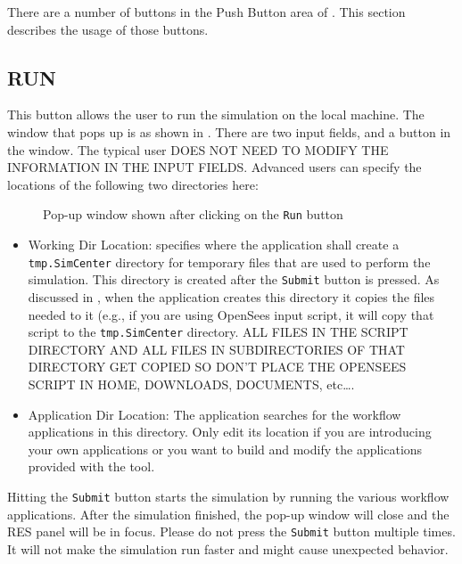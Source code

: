 There are a number of buttons in the Push Button area of . This section describes the usage of those buttons.

\subsection{RUN}

This button allows the user to run the simulation on the local machine. The window that pops up is as shown in . There
are two input fields, and a button in the window. The typical user DOES NOT NEED TO MODIFY THE INFORMATION IN THE INPUT FIELDS. Advanced users can specify the locations of the following two directories here:

\begin{figure}[!htbp]
  \caption{Pop-up window shown after clicking on the \texttt{Run} button}
  \label{fig:run_button_popup}
\end{figure}

\begin{itemize}
\item Working Dir Location: specifies where the \texttt{\getsoftwarename{}} application shall
create a \texttt{tmp.SimCenter} directory for temporary files that are used to perform the simulation. This directory is created after the \texttt{Submit} button is pressed. As discussed in , when
the application creates this directory it copies the files needed to it (e.g., if you are using OpenSees input script, it
will copy that script to the \texttt{tmp.SimCenter} directory. ALL FILES IN
THE SCRIPT DIRECTORY AND ALL FILES IN SUBDIRECTORIES OF THAT DIRECTORY GET
COPIED SO DON’T PLACE THE OPENSEES SCRIPT IN HOME, DOWNLOADS, DOCUMENTS, etc….
\item Application Dir Location: The \texttt{\getsoftwarename{}} application searches for the workflow applications in this directory. Only edit its location if you are introducing your own applications or you want to build and modify the 
applications provided with the tool. 
\end{itemize}

Hitting the \texttt{Submit} button starts the simulation by running the various workflow applications. After the simulation finished, the pop-up window will close and the RES panel will be in focus. Please do not press the \texttt{Submit} button multiple times. It will not make the simulation run faster and might cause unexpected behavior.

